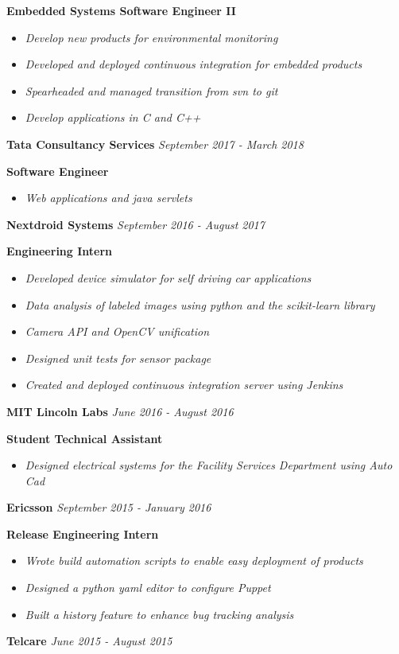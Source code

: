 \documentclass[8pt]{extarticle}
\begin{document}
{\tiny }
\textbf{Embedded Systems Software Engineer II}
\begin{itemize}
	\item \textit{Develop new products for environmental monitoring}
	\item \textit{Developed and deployed continuous integration for embedded products}
	\item \textit{Spearheaded and managed transition from svn to git}
	\item \textit{Develop applications in C and C++}
\end{itemize}
\textbf{Tata Consultancy Services} \hfill\textit{September 2017 - March 2018}

{\tiny }
\textbf{Software Engineer}
\begin{itemize}
\item \textit{Web applications and java servlets}
\end{itemize}
\textbf{Nextdroid Systems} \hfill\textit{September 2016 - August 2017}

{\tiny }
\textbf{Engineering Intern} 
\begin{itemize}
\item \textit{Developed device simulator for self driving car applications}
\item \textit{Data analysis of labeled images using python and the scikit-learn library}
\item \textit{Camera API and OpenCV unification}
\item \textit{Designed unit tests for sensor package}
\item \textit{Created and deployed continuous integration server using Jenkins}
\end{itemize}
\textbf{MIT Lincoln Labs} \hfill\textit{June  2016 - August 2016}

\textbf{Student Technical Assistant } 
\begin{itemize}
\item \textit{Designed electrical systems for the Facility Services Department using Auto Cad}
\end{itemize}
\textbf{Ericsson} \textit{September  2015 - January 2016}

\textbf{Release Engineering Intern } 
\begin{itemize}
\item \textit{Wrote build automation scripts to enable easy deployment of products}
\item \textit{Designed a python yaml editor to configure Puppet}
\item \textit{Built a history feature to enhance bug tracking analysis}

\end{itemize}
\textbf{Telcare} \hfill\textit{June  2015 - August 2015}
\end{document}
